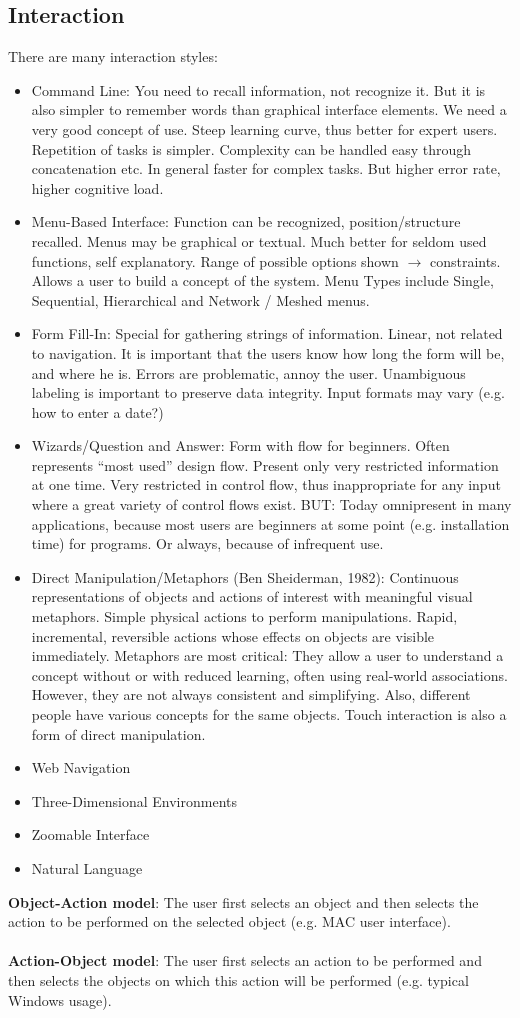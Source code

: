 \subsection{Interaction}
There are many interaction styles: 
\begin{itemize}
\item Command Line: You need to recall information, not recognize it. But it is also simpler to remember words than graphical interface elements. We need a very good concept of use. Steep learning curve, thus better for expert users. Repetition of tasks is simpler. Complexity can be handled easy through concatenation etc. In general faster for complex tasks. But higher error rate, higher cognitive load.
\item Menu-Based Interface: Function can be recognized, position/structure recalled. Menus may be graphical or textual. Much better for seldom used functions, self explanatory. Range of possible options shown $\rightarrow$ constraints. Allows a user to build a concept of the system. Menu Types include Single, Sequential, Hierarchical and Network / Meshed menus.
\item Form Fill-In: Special for gathering strings of information. Linear, not related to navigation. It is important that the users know how long the form will be, and where he is. Errors are problematic, annoy the user. Unambiguous labeling is important to preserve data integrity. Input formats may vary (e.g. how to enter a date?)
\item Wizards/Question and Answer: Form with flow for beginners. Often represents ``most used'' design flow. Present only very restricted information at one time. Very restricted in control flow, thus inappropriate for any input where a great variety of control flows exist. BUT: Today omnipresent in many applications, because most users are beginners at some point (e.g. installation time) for programs. Or always, because of infrequent use.
\item Direct Manipulation/Metaphors (Ben Sheiderman, 1982): Continuous representations of objects and actions of interest with meaningful visual metaphors. Simple physical actions to perform manipulations. Rapid, incremental, reversible actions whose effects on objects are visible immediately. Metaphors are most critical: They allow a user to understand a concept without or with reduced learning, often using real-world associations. However, they are not always consistent and simplifying. Also, different people have various concepts for the same objects. Touch interaction is also a form of direct manipulation.
\item Web Navigation
\item Three-Dimensional Environments
\item Zoomable Interface
\item Natural Language
\end{itemize}
\textbf{Object-Action model}: The user first selects an object and then selects the action to be performed on the selected object (e.g. MAC user interface).\\\\
\textbf{Action-Object model}: The user first selects an action to be performed and then selects the objects on which this action will be performed (e.g. typical Windows usage).